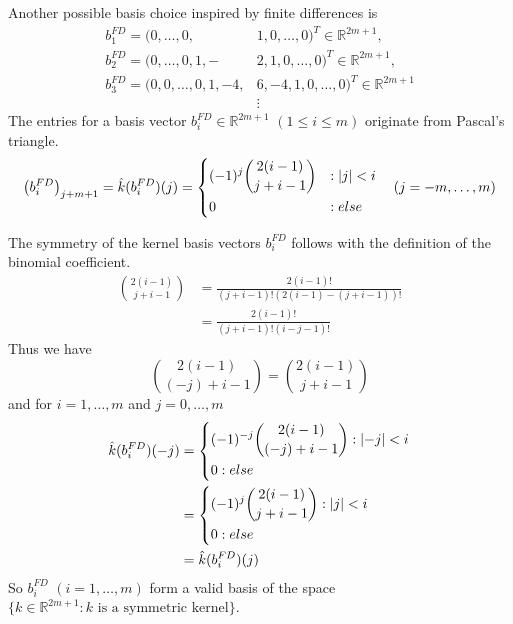 \documentclass[twoside,a4paper]{article}
\begin{document}
Another possible basis choice inspired by finite differences is
\begin{align*}
	b_1^{FD} = (0, \dots, 0,& 1,0, \dots, 0)^T \in \mathbb{R}^{2m+1},\\
	b_2^{FD} = (0, \dots, 0, 1,-&2,1, 0, \dots, 0)^T \in \mathbb{R}^{2m+1},\\
	b_3^{FD} = (0, 0, \dots, 0, 1,-4,& 6,-4,1, 0, \dots, 0)^T \in \mathbb{R}^{2m+1} \\
	&\vdots
\end{align*}
The entries for a basis vector $b_i^{FD} \in \mathbb{R}^{2m+1}$ $(1 \leq i \leq m)$ 
originate from Pascal's triangle.
\begin{equation*}
	\left( b_i^{FD} \right)_{j+m+1} = \hat{k}(b_i^{FD})(j) = \begin{dcases}
		(-1)^j \binom{2(i-1)}{j+i-1} &: \left|{j}\right| < i \\
		0 &: else
	\end{dcases}
	\quad (j=-m, \dots, m)
\end{equation*}

The symmetry of the kernel basis vectors $b_i^{FD}$ follows with the definition of the binomial coefficient.
\begin{align*}
	\binom{2(i-1)}{j+i-1} &= \frac{2(i-1)!}{(j+i-1)!(2(i-1)-(j+i-1))!} \\
	&= \frac{2(i-1)!}{(j+i-1)!(i-j-1)!}
\end{align*}
Thus we have
\begin{equation*}
	\binom{2(i-1)}{(-j)+i-1} = \binom{2(i-1)}{j+i-1}
\end{equation*}
and for $i=1, \dots, m$ and $j= 0, \dots, m$
\begin{align*}
	\hat{k}(b_i^{FD})(-j) &= \begin{dcases}
		(-1)^{-j} \binom{2(i-1)}{(-j)+i-1} : \left|{-j}\right| < i \\
		0 : else
	\end{dcases} \\
	&= \begin{dcases}
		(-1)^{j} \binom{2(i-1)}{j+i-1} : \left|{j}\right| < i \\
		0 : else
	\end{dcases} \\
	&= \hat{k}(b_i^{FD})(j) 
\end{align*}
So $b_i^{FD}$ $(i=1, \dots, m)$ form a valid basis of
the space $\{ k \in \mathbb{R}^{2m+1} : k \text{ is a symmetric kernel} \}$.

\end{document}
